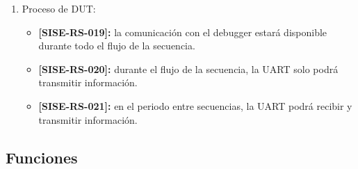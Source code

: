 \documentclass[
11pt, %
codirector, %
]{charter}
\def\codigo{SISE-RS}
\newcommand{\req}[1]{\textbf{[\codigo-#1]:}}
\begin{document}
\begin{enumerate}
\begin{enumerate}
\begin{itemize}
\begin{itemize}
							\item \req{016} se indicará en todo momento el nodo actual y todos los nodos que lleven a la raíz del árbol.
						\end{itemize}
				\end{itemize}
			\item Con DUT:
				\begin{itemize}
					\item \req{017} la comunicación con UART será en 9600 baudios, 8 bits de datos, 1 bit de parada y 0 bits de paridad.
					\item \req{018} la comunicación con el debugger conformará con la configuración recomendada por el fabricante.
				\end{itemize}
		\end{enumerate}
	\item Proceso de DUT:
		\begin{itemize}
			\item \req{019} la comunicación con el debugger estará disponible durante todo el flujo de la secuencia.
			\item \req{020} durante el flujo de la secuencia, la UART solo podrá transmitir información.
			\item \req{021} en el periodo entre secuencias, la UART podrá recibir y transmitir información.
		\end{itemize}
\end{enumerate}

\subsection{Funciones}
\label{sub:funciones}
\end{document}
